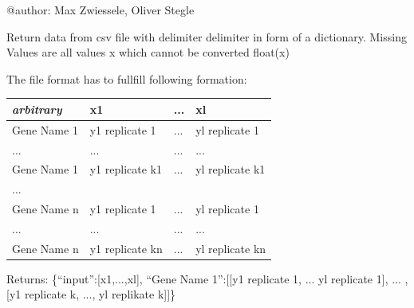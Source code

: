\documentclass[letterpaper,10pt,english]{sphinxmanual}
\begin{document}
@author: Max Zwiessele, Oliver Stegle

\begin{fulllineitems}
\label{data:gptwosample.data.dataIO.get_data_from_csv}
Return data from csv file with delimiter delimiter in form of a dictionary.
Missing Values are all values x which cannot be converted float(x)

The file format has to fullfill following formation:

\begin{tabulary}{\linewidth}{|L|L|L|L|}
\hline
\textbf{
\emph{arbitrary}
} & \textbf{
x1
} & \textbf{
...
} & \textbf{
xl
}\\\hline

Gene Name 1
 & 
y1 replicate 1
 & 
...
 & 
yl replicate 1
\\\hline

...
 & 
...
 & 
...
 & 
...
\\\hline

Gene Name 1
 & 
y1 replicate k1
 & 
...
 & 
yl replicate k1
\\\hline

...
 &  &  & \\\hline

Gene Name n
 & 
y1 replicate 1
 & 
...
 & 
yl replicate 1
\\\hline

...
 & 
...
 & 
...
 & 
...
\\\hline

Gene Name n
 & 
y1 replicate kn
 & 
...
 & 
yl replicate kn
\\\hline
\end{tabulary}


Returns: \{``input'':{[}x1,...,xl{]}, ``Gene Name 1'':{[}{[}y1 replicate 1, ... yl replicate 1{]}, ... ,{[}y1 replicate k, ..., yl replikate k{]}{]}\}

\end{fulllineitems}

\end{document}
